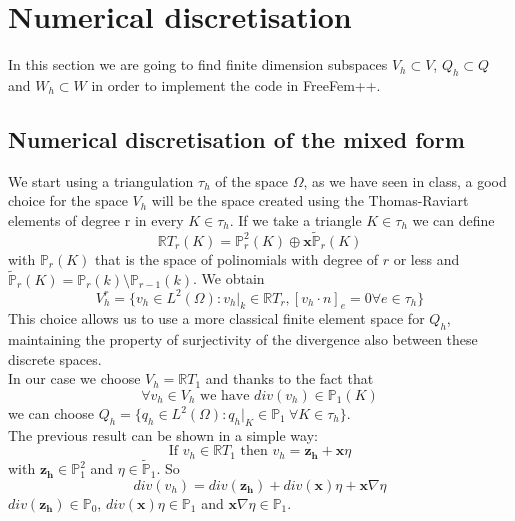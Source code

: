 \documentclass[]{report}
\begin{document}
\section{Numerical discretisation}
In this section we are going to find finite dimension subspaces $V_h \subset V$, $Q_h \subset Q$ and $W_h \subset W$ in order to implement the code in FreeFem++.
\subsection{Numerical discretisation of the mixed form}
We start using a triangulation $\tau_h$ of the space $\Omega$, as we have seen in class, a good choice for the space $V_h$ will be the space created using the Thomas-Raviart elements of degree r in every $K\in\tau_h$. If we take a triangle $K\in \tau_h$ we can define
\begin{equation*}
	\mathbb{R}T_r(K)=\mathbb{P}_r^2(K)\oplus\mathbf{x}\tilde{\mathbb{P}}_r(K)
\end{equation*}
with $\mathbb{P}_r(K)$ that is the space of polinomials with degree of $r$ or less and $\tilde{\mathbb{P}}_r(K)=\mathbb{P}_r(k)\setminus\mathbb{P}_{r-1}(k)$. We obtain
\begin{equation}
	V_h^r=\{v_h\in L^2(\Omega):v_h|_k\in\mathbb{R}T_r,[v_h\cdot n]_e=0 \forall e \in \tau_h \}
\end{equation}
This choice allows us to use a  more classical finite element space for $Q_h$, maintaining the property of surjectivity of the divergence also between these discrete spaces.\\
In our case we choose  $V_h=\mathbb{R}T_1$ and thanks to the fact that 
\begin{equation*}
	\forall v_h \in V_h \mbox{ we have } div(v_h)\in \mathbb{P}_1(K)
\end{equation*}
we can choose $Q_h=\{q_h\in L^2(\Omega):q_h|_K\in\mathbb{P}_1\ \forall K\in\tau_h\}$.\\
The previous result can be shown in a simple way:
\begin{equation*}
	\mbox{If }v_h\in \mathbb{R}T_1 \mbox{ then }v_h=\mathbf{z_h}+\mathbf{x}\eta
\end{equation*}
with $\mathbf{z_h}\in \mathbb{P}_1^2$ and $\eta \in \tilde{\mathbb{P}}_1$. So
\begin{equation*}
	div(v_h)=div(\mathbf{z_h})+div(\mathbf{x})\eta+\mathbf{x}\nabla\eta
\end{equation*}
 $div(\mathbf{z_h})\in\mathbb{P}_0$, $div(\mathbf{x})\eta\in\mathbb{P}_1$ and $\mathbf{x}\nabla\eta\in\mathbb{P}_1$.\\
\end{document}
